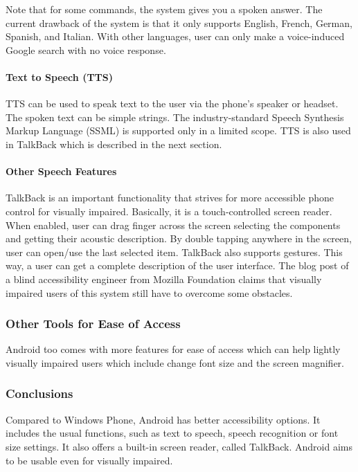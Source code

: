 Note that for some commands, the system gives you a spoken answer. The current drawback of the system is that it only supports English, French, German, Spanish, and Italian. With other languages, user can only make a voice-induced Google search with no voice response.
\paragraph{Text to Speech (TTS)}
TTS can be used to speak text to the user via the phone's speaker or headset. The spoken text can be simple strings. The industry-standard Speech Synthesis Markup Language (SSML) is supported only in a limited scope. TTS is also used in TalkBack which is described in the next section.
\paragraph{Other Speech Features}
TalkBack is an important functionality that strives for more accessible phone control for visually impaired. Basically, it is a touch-controlled screen reader. When enabled, user can drag finger across the screen selecting the components and getting their acoustic description. By double tapping anywhere in the screen, user can open/use the last selected item. TalkBack also supports gestures. This way, a user can get a complete description of the user interface. The blog post of a blind accessibility engineer from Mozilla Foundation \cite{mozillaguy} claims that visually impaired users of this system still have to overcome some obstacles.

\subsubsection{Other Tools for Ease of Access}
Android too comes with more features for ease of access which can help lightly visually impaired users which include change font size and the screen magnifier.

\subsubsection{Conclusions}
Compared to Windows Phone, Android has better accessibility options. It includes the usual functions, such as text to speech, speech recognition or font size settings. It also offers a built-in screen reader, called TalkBack. Android aims to be usable even for visually impaired.

